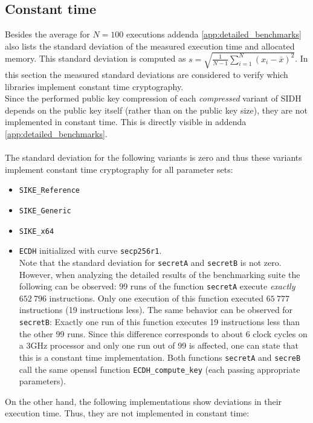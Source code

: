 \subsection{Constant time}\label{sec:analysis_security_time}
Besides the average for $N=100$ executions addenda \ref{app:detailed_benchmarks} also lists the standard deviation of the measured execution time and allocated memory. This standard deviation is computed as $s=\sqrt{\frac{1}{N-1}\sum_{i=1}^N(x_i-\bar{x})^2}$. In this section the measured standard deviations are considered to verify which libraries implement constant time cryptography.\\
Since the performed public key compression of each \textit{compressed} variant of \gls{SIDH} depends on the public key itself (rather than on the public key size), they are not implemented in constant time. This is directly visible in  addenda \ref{app:detailed_benchmarks}.\\\\
The standard deviation for the following variants is zero and thus these variants implement constant time cryptography for all parameter sets:
\begin{itemize}
\item \texttt{SIKE\_Reference}
\item \texttt{SIKE\_Generic} 
\item \texttt{SIKE\_x64}
\item \texttt{\gls{ECDH}} initialized with curve \texttt{secp256r1}.\\
Note that the standard deviation for \texttt{secretA} and \texttt{secretB} is not zero. However, when analyzing the detailed results of the benchmarking suite the following can be observed: 99 runs of the function \texttt{secretA} execute \textit{exactly} $652\:796$ instructions. Only one execution of this function executed $65\:777$ instructions (19 instructions less). The same behavior can be observed for \texttt{secretB}: Exactly one run of this function executes 19 instructions less than the other 99 runs. Since this difference corresponds to about 6 clock cycles on a 3GHz processor and only one run out of 99 is affected, one can state that this is a constant time implementation. Both functions \texttt{secretA} and \texttt{secreB} call the same \gls{openssl} function \texttt{ECDH\_compute\_key} (each passing appropriate parameters).
\end{itemize}
On the other hand, the following implementations show deviations in their execution time. Thus, they are not implemented in constant time:

